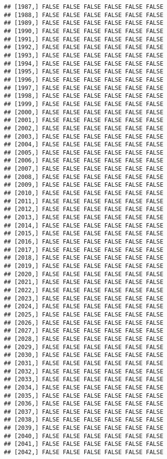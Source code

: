 \documentclass[
]{article}
\begin{document}
\begin{verbatim}
## [1987,] FALSE FALSE FALSE FALSE FALSE FALSE
## [1988,] FALSE FALSE FALSE FALSE FALSE FALSE
## [1989,] FALSE FALSE FALSE FALSE FALSE FALSE
## [1990,] FALSE FALSE FALSE FALSE FALSE FALSE
## [1991,] FALSE FALSE FALSE FALSE FALSE FALSE
## [1992,] FALSE FALSE FALSE FALSE FALSE FALSE
## [1993,] FALSE FALSE FALSE FALSE FALSE FALSE
## [1994,] FALSE FALSE FALSE FALSE FALSE FALSE
## [1995,] FALSE FALSE FALSE FALSE FALSE FALSE
## [1996,] FALSE FALSE FALSE FALSE FALSE FALSE
## [1997,] FALSE FALSE FALSE FALSE FALSE FALSE
## [1998,] FALSE FALSE FALSE FALSE FALSE FALSE
## [1999,] FALSE FALSE FALSE FALSE FALSE FALSE
## [2000,] FALSE FALSE FALSE FALSE FALSE FALSE
## [2001,] FALSE FALSE FALSE FALSE FALSE FALSE
## [2002,] FALSE FALSE FALSE FALSE FALSE FALSE
## [2003,] FALSE FALSE FALSE FALSE FALSE FALSE
## [2004,] FALSE FALSE FALSE FALSE FALSE FALSE
## [2005,] FALSE FALSE FALSE FALSE FALSE FALSE
## [2006,] FALSE FALSE FALSE FALSE FALSE FALSE
## [2007,] FALSE FALSE FALSE FALSE FALSE FALSE
## [2008,] FALSE FALSE FALSE FALSE FALSE FALSE
## [2009,] FALSE FALSE FALSE FALSE FALSE FALSE
## [2010,] FALSE FALSE FALSE FALSE FALSE FALSE
## [2011,] FALSE FALSE FALSE FALSE FALSE FALSE
## [2012,] FALSE FALSE FALSE FALSE FALSE FALSE
## [2013,] FALSE FALSE FALSE FALSE FALSE FALSE
## [2014,] FALSE FALSE FALSE FALSE FALSE FALSE
## [2015,] FALSE FALSE FALSE FALSE FALSE FALSE
## [2016,] FALSE FALSE FALSE FALSE FALSE FALSE
## [2017,] FALSE FALSE FALSE FALSE FALSE FALSE
## [2018,] FALSE FALSE FALSE FALSE FALSE FALSE
## [2019,] FALSE FALSE FALSE FALSE FALSE FALSE
## [2020,] FALSE FALSE FALSE FALSE FALSE FALSE
## [2021,] FALSE FALSE FALSE FALSE FALSE FALSE
## [2022,] FALSE FALSE FALSE FALSE FALSE FALSE
## [2023,] FALSE FALSE FALSE FALSE FALSE FALSE
## [2024,] FALSE FALSE FALSE FALSE FALSE FALSE
## [2025,] FALSE FALSE FALSE FALSE FALSE FALSE
## [2026,] FALSE FALSE FALSE FALSE FALSE FALSE
## [2027,] FALSE FALSE FALSE FALSE FALSE FALSE
## [2028,] FALSE FALSE FALSE FALSE FALSE FALSE
## [2029,] FALSE FALSE FALSE FALSE FALSE FALSE
## [2030,] FALSE FALSE FALSE FALSE FALSE FALSE
## [2031,] FALSE FALSE FALSE FALSE FALSE FALSE
## [2032,] FALSE FALSE FALSE FALSE FALSE FALSE
## [2033,] FALSE FALSE FALSE FALSE FALSE FALSE
## [2034,] FALSE FALSE FALSE FALSE FALSE FALSE
## [2035,] FALSE FALSE FALSE FALSE FALSE FALSE
## [2036,] FALSE FALSE FALSE FALSE FALSE FALSE
## [2037,] FALSE FALSE FALSE FALSE FALSE FALSE
## [2038,] FALSE FALSE FALSE FALSE FALSE FALSE
## [2039,] FALSE FALSE FALSE FALSE FALSE FALSE
## [2040,] FALSE FALSE FALSE FALSE FALSE FALSE
## [2041,] FALSE FALSE FALSE FALSE FALSE FALSE
## [2042,] FALSE FALSE FALSE FALSE FALSE FALSE

\end{verbatim}
\end{document}
